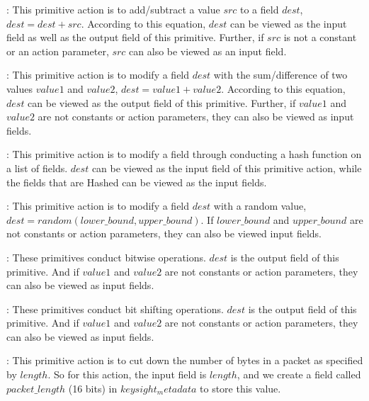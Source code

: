 \documentclass[sigconf, 10pt]{acmart}
\theoremstyle{plain}
\begin{document}
: This primitive action is to add/subtract a value $src$ to a field $dest$, \ie{} $dest = dest + src$. According to this equation, $dest$ can be viewed as the input field as well as the output field of this primitive. Further, if $src$ is not a constant or an action parameter, $src$ can also be viewed as an input field.

: This primitive action is to modify a field $dest$ with the sum/difference of two values $value1$ and $value2$, \ie{} $dest = value1 + value2$. According to this equation, $dest$ can be viewed as the output field of this primitive. Further, if $value1$ and $value2$ are not constants or action parameters, they can also be viewed as input fields.

: This primitive action is to modify a field through conducting a hash function on a list of fields. $dest$ can be viewed as the input field of this primitive action, while the fields that are Hashed can be viewed as the input fields.

: This primitive action is to modify a field $dest$ with a random value, \ie{} $dest = random(lower\_bound, upper\_bound)$. If $lower\_bound$ and $upper\_bound$ are not constants or action parameters, they can also be viewed input fields.

: These primitives conduct bitwise operations. $dest$ is the output field of this primitive. And if $value1$ and $value2$ are not constants or action parameters, they can also be viewed as input fields.

: These primitives conduct bit shifting operations. $dest$ is the output field of this primitive. And if $value1$ and $value2$ are not constants or action parameters, they can also be viewed as input fields.



: This primitive action is to cut down the number of bytes in a packet as specified by $length$. So for this action, the input field is $length$, and we create a field called $packet\_length$ (16 bits) in $keysight_metadata$ to store this value.
\end{document}
